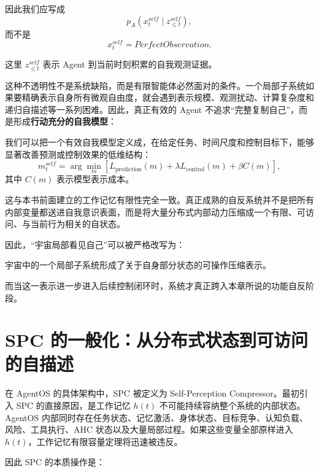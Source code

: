 因此我们应写成
\[
p_A\left(
x_t^{self}
\mid
z_{\leq t}^{self}
\right),
\]
而不是
\[
x_t^{self}
=
PerfectObservation.
\]

这里 \(z_{\leq t}^{self}\) 表示 Agent 到当前时刻积累的自我观测证据。

这种不透明性不是系统缺陷，而是有限智能体必然面对的条件。一个局部子系统如果要精确表示自身所有微观自由度，就会遇到表示规模、观测扰动、计算复杂度和递归自描述等一系列困难。因此，真正有效的 Agent 不追求“完整复制自己”，而是形成\textbf{行动充分的自我模型}：
\begin{statementbox}
\centering
{}
\end{statementbox}

我们可以把一个有效自我模型定义成，在给定任务、时间尺度和控制目标下，能够显著改善预测或控制效果的低维结构：
\[
m_t^{self}
=
\arg\min_m
\left[
L_{\mathrm{prediction}}(m)
+
\lambda L_{\mathrm{control}}(m)
+
\beta C(m)
\right],
\]
其中 \(C(m)\) 表示模型表示成本。

这与本书前面建立的工作记忆有限性完全一致。真正成熟的自反系统并不是把所有内部变量都送进自我意识表面，而是将大量分布式内部动力压缩成一个有限、可访问、与当前行为相关的自状态。

因此，“宇宙局部看见自己”可以被严格改写为：
\begin{statementbox}
宇宙中的一个局部子系统形成了关于自身部分状态的可操作压缩表示。
\end{statementbox}

而当这一表示进一步进入后续控制闭环时，系统才真正跨入本章所说的功能自反阶段。

\section{SPC 的一般化：从分布式状态到可访问的自描述}

在 AgentOS 的具体架构中，SPC 被定义为 Self-Perception Compressor。最初引入 SPC 的直接原因，是工作记忆 \(h(t)\) 不可能持续容纳整个系统的内部状态。AgentOS 内部同时存在任务状态、记忆激活、身体状态、目标竞争、认知负载、风险、工具执行、AHC 状态以及大量局部过程。如果这些变量全部原样进入 \(h(t)\)，工作记忆有限容量定理将迅速被违反。

因此 SPC 的本质操作是：
\begin{statementbox}
\centering
{}
\end{statementbox}

